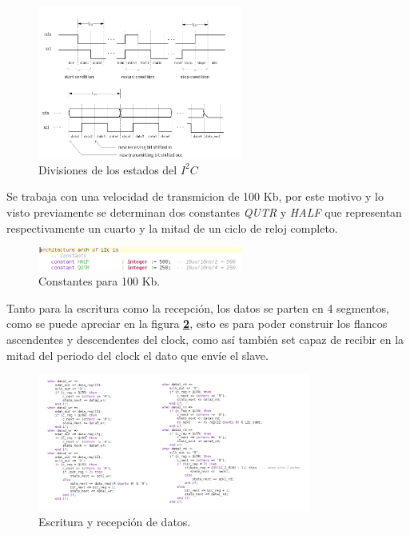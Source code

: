 \documentclass[11pt, a4paper]{article}
\begin{document}
		\begin{figure}[H]
			\centering
			\includegraphics[width=0.6\textwidth]{Imagenes/time-gen.png}
			\caption{Divisiones de los estados del $I^{2}C$}
			\label{fig:time_gen}
		\end{figure} 

		Se trabaja con una velocidad de transmicion de 100 Kb, por este motivo y lo visto previamente se determinan dos constantes \textit{QUTR} y \textit{HALF} que representan respectivamente un cuarto y la mitad de un ciclo de reloj completo.

		\begin{figure}[H]
			\centering
			\includegraphics[width=0.6\textwidth]{Imagenes/period.png}
			\caption{Constantes para 100 Kb.}
		\end{figure} 

		Tanto para la escritura como la recepción, los datos se parten en 4 segmentos, como se puede apreciar en la figura \textcolor{blue}{\textbf{\ref{fig:data_proc}}}, esto es para poder construir los flancos ascendentes y descendentes del clock, como así también set capaz de recibir en la mitad del periodo del clock el dato que envíe el slave.

		\begin{figure}[H]
			\centering
			\includegraphics[width=0.8\textwidth]{Imagenes/data_proc.png}
			\caption{Escritura y recepción de datos.}
			\label{fig:data_proc}
		\end{figure} 
		
\end{document}
